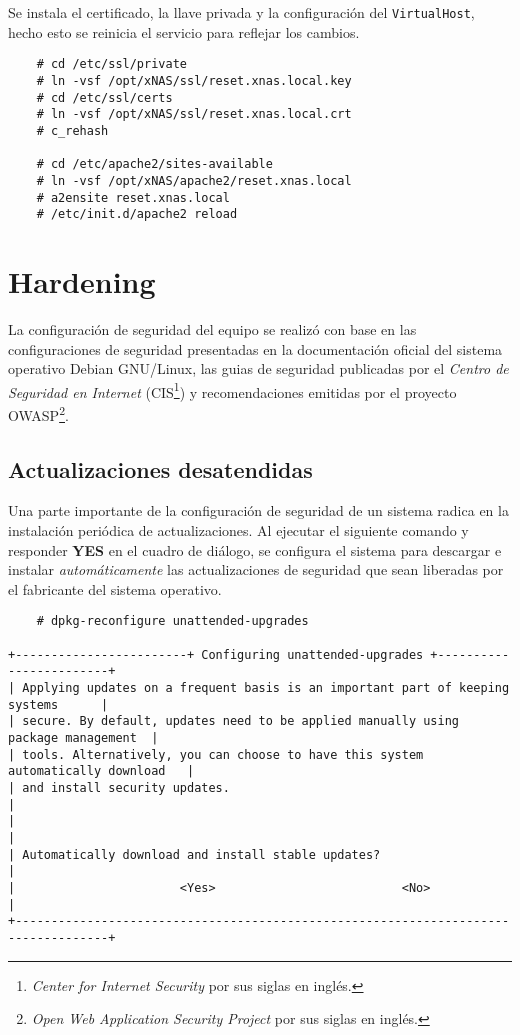 Se instala el certificado, la llave privada y la configuraci\'{o}n del \texttt{VirtualHost}, hecho esto se reinicia el servicio para reflejar los cambios.

{
\scriptsize
\linespread{1}
\begin{verbatim}
    # cd /etc/ssl/private
    # ln -vsf /opt/xNAS/ssl/reset.xnas.local.key
    # cd /etc/ssl/certs
    # ln -vsf /opt/xNAS/ssl/reset.xnas.local.crt
    # c_rehash

    # cd /etc/apache2/sites-available
    # ln -vsf /opt/xNAS/apache2/reset.xnas.local
    # a2ensite reset.xnas.local
    # /etc/init.d/apache2 reload
\end{verbatim}
}

    \section {Hardening}

La configuraci\'{o}n de seguridad del equipo se realiz\'{o} con base en las configuraciones de seguridad presentadas en la documentaci\'{o}n oficial del sistema operativo Debian \textsc{GNU}/Linux\cite{_securing_????}, las guias de seguridad publicadas por el \emph{Centro de Seguridad en Internet} (\textsc{CIS}\footnote{\emph{Center for Internet Security} por sus siglas en ingl\'{e}s.})\cite{_center_????} y recomendaciones emitidas por el proyecto \textsc{OWASP}\footnote{\emph{Open Web Application Security Project} por sus siglas en ingl\'{e}s.}\cite{_scg_????}.

      \subsection {Actualizaciones desatendidas}

Una parte importante de la configuraci\'{o}n de seguridad de un sistema radica en la instalaci\'{o}n peri\'{o}dica de actualizaciones. Al ejecutar el siguiente comando y responder \textbf{YES} en el cuadro de di\'{a}logo, se configura el sistema para descargar e instalar \emph{autom\'{a}ticamente} las actualizaciones de seguridad que sean liberadas por el fabricante del sistema operativo.

{
\scriptsize
\linespread{1}
\begin{verbatim}
    # dpkg-reconfigure unattended-upgrades

+------------------------+ Configuring unattended-upgrades +------------------------+
| Applying updates on a frequent basis is an important part of keeping systems      |
| secure. By default, updates need to be applied manually using package management  |
| tools. Alternatively, you can choose to have this system automatically download   |
| and install security updates.                                                     |
|                                                                                   |
| Automatically download and install stable updates?                                |
|                       <Yes>                          <No>                         |
+-----------------------------------------------------------------------------------+
\end{verbatim}
}

